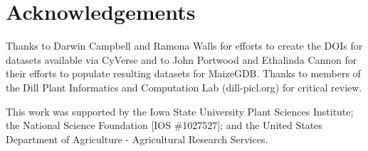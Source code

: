 \section{Acknowledgements}
Thanks to Darwin Campbell and Ramona Walls for efforts to create the DOIs for datasets available via CyVerse and to John Portwood and Ethalinda Cannon for their efforts to populate resulting datasets for MaizeGDB. Thanks to members of the Dill Plant Informatics and Computation Lab (dill-picl.org) for critical review.

This work was supported by the Iowa State University Plant Sciences Institute; the National Science Foundation [IOS \#1027527]; and the United States Department of Agriculture - Agricultural Research Services.
